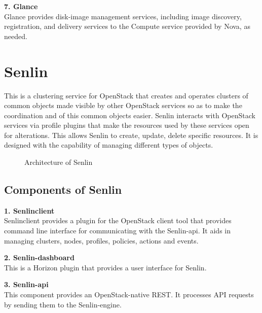 \textbf{7. Glance} \\
Glance provides disk-image management services, including image discovery, registration, and delivery services to the Compute service provided by Nova, as needed.

\section{Senlin}
This is a clustering service for OpenStack that creates and operates clusters of common objects made visible by other OpenStack services so as to make the coordination and of this common objects easier. Senlin interacts with OpenStack services via profile plugins that make the resources used by these services open for alterations. This allows Senlin to create, update, delete specific resources. It is designed with the capability of managing different types of objects. 

\begin{figure}[h]
\centering
{}
  \caption{Architecture of Senlin}
  \label{fig: Senlin_Arch_OpenStackDoc}
  \end{figure}

\subsection{Components of Senlin}
\textbf{1. Senlinclient} \\
Senlinclient provides a plugin for the OpenStack client tool that provides command line interface for communicating with the Senlin-api. It aids in managing clusters, nodes, profiles, policies, actions and events.

\textbf{2. Senlin-dashboard} \\
This is a Horizon plugin that provides a user interface for Senlin.

\textbf{3. Senlin-api} \\
This component provides an OpenStack-native REST. It processes API requests by sending them to the Senlin-engine.


